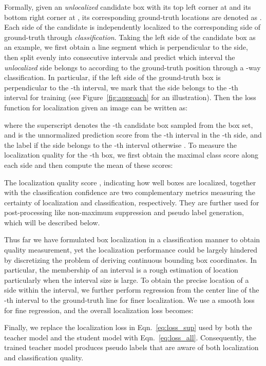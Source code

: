 \documentclass[letterpaper]{article} \usepackage{aaai22}  \usepackage{times}  \usepackage{helvet}  \usepackage{courier}  \usepackage[hyphens]{url}  \usepackage{graphicx} \urlstyle{rm} \def\UrlFont{\rm}  \usepackage{natbib}  \usepackage{caption} \DeclareCaptionStyle{ruled}{labelfont=normalfont,labelsep=colon,strut=off} \frenchspacing  \setlength{\pdfpagewidth}{8.5in}  \setlength{\pdfpageheight}{11in}  \usepackage{algorithm}
\begin{document}
Formally, given an \emph{unlocalized} candidate box  with its top left corner at  and its bottom right corner at , its corresponding ground-truth locations are denoted as . Each side of the candidate is independently localized to the corresponding side of ground-truth through \emph{classification}. Taking the left side of the candidate box as an example, we first obtain a line segment  which is perpendicular to the side, then split  evenly into  consecutive intervals and predict which interval the \emph{unlocalized} side belongs to according to the ground-truth position  through a -way classification. In particular, if the left side of the ground-truth box is perpendicular to the -th interval, we mark that the side belongs to the -th interval for training (see Figure~\ref{fig:approach} for an illustration). Then the loss function for localization given an image can be written as:
 
where the superscript  denotes the -th candidate box sampled from the box set, and  is the unnormalized prediction score from the -th interval in the -th side, and the label  if the side belongs to the -th interval otherwise . To measure the localization quality for the -th box, we first obtain the maximal class score along each side and then compute the mean of these scores:

The localization quality score , indicating how well boxes are localized, together with the classification confidence  are two complementary metrics measuring the certainty of localization and classification, respectively. They are further used for post-processing like non-maximum suppression and pseudo label generation, which will be described below. 


Thus far we have formulated box localization in a classification manner to obtain quality measurement, yet the localization performance could be largely hindered by discretizing the problem of deriving continuous bounding box coordinates. In particular, the membership of an interval is a rough estimation of location particularly when the interval size is large. 
To obtain the precise location of a side within the interval, we further perform regression from the center line  of the -th interval to the ground-truth line  for finer localization. We use a smooth  loss for fine regression, and the overall localization loss becomes:
 
Finally, we replace the localization loss in Eqn.~\ref{eq:loss_sup} used by both the teacher model and the student model with Eqn.~\ref{eq:loss_all}. Consequently, the trained teacher model produces pseudo labels that are aware of both localization and classification quality. 
\end{document}
